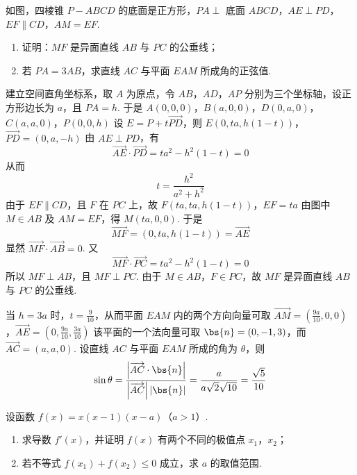 \begin{problem}
如图，四棱锥 \(P-ABCD\) 的底面是正方形，\(PA\perp\) 底面 \(ABCD\)，\(AE\perp PD\)，\(EF\parallel CD\)，\(AM=EF\).

\begin{enumerate}
\item 证明：\(MF\) 是异面直线 \(AB\) 与 \(PC\) 的公垂线；
\item 若 \(PA=3AB\)，求直线 \(AC\) 与平面 \(EAM\) 所成角的正弦值.
\end{enumerate}
\end{problem}

\begin{solution}
建立空间直角坐标系，取 \(A\) 为原点，令 \(AB\)，\(AD\)，\(AP\) 分别为三个坐标轴，设正方形边长为 \(a\)，且 \(PA=h\). 于是
\(A(0,0,0)\)，\(B(a,0,0)\)，\(D(0,a,0)\)，\(C(a,a,0)\)，\(P(0,0,h)\)
设 \(E=P+t\overrightarrow{PD}\)，则
\(E(0,ta,h(1-t))\)，\(\overrightarrow{PD}=(0,a,-h)\)
由 \(AE\perp PD\)，有
\[
\overrightarrow{AE}\cdot\overrightarrow{PD}=ta^2-h^2(1-t)=0
\]
从而
\[
t=\frac{h^2}{a^2+h^2}\]
由于 \(EF\parallel CD\)，且 \(F\) 在 \(PC\) 上，故
\(F(ta,ta,h(1-t))\)，\(EF=ta\)
由图中 \(M\in AB\) 及 \(AM=EF\)，得 \(M(ta,0,0)\). 于是
\[
\overrightarrow{MF}=\left(0,ta,h(1-t)\right)=\overrightarrow{AE}\]
显然 \(\overrightarrow{MF}\cdot\overrightarrow{AB}=0\). 又
\[
\overrightarrow{MF}\cdot\overrightarrow{PC}=ta^2-h^2(1-t)=0\]
所以 \(MF\perp AB\)，且 \(MF\perp PC\). 由于 \(M\in AB\)，\(F\in PC\)，故 \(MF\) 是异面直线 \(AB\) 与 \(PC\) 的公垂线.

当 \(h=3a\) 时，\(t=\frac{9}{10}\)，从而平面 \(EAM\) 内的两个方向向量可取
\(\overrightarrow{AM}=\left(\frac{9a}{10},0,0\right)\)，\(\overrightarrow{AE}=\left(0,\frac{9a}{10},\frac{3a}{10}\right)\)
该平面的一个法向量可取 \(\bs{n}=(0,-1,3)\)，而 \(\overrightarrow{AC}=(a,a,0)\). 设直线 \(AC\) 与平面 \(EAM\) 所成的角为 \(\theta\)，则
\[
\sin\theta=\frac{\left|\overrightarrow{AC}\cdot\bs{n}\right|}{\left|\overrightarrow{AC}\right|\left|\bs{n}\right|}=\frac{a}{a\sqrt{2}\sqrt{10}}=\frac{\sqrt{5}}{10}\]
\end{solution}

\begin{problem}
设函数 \(f(x)=x(x-1)(x-a)\)（\(a>1\)）.

\begin{enumerate}
\item 求导数 \(f'(x)\)，并证明 \(f(x)\) 有两个不同的极值点 \(x_1\)，\(x_2\)；
\item 若不等式 \(f(x_1)+f(x_2)\leqslant0\) 成立，求 \(a\) 的取值范围.
\end{enumerate}
\end{problem}

